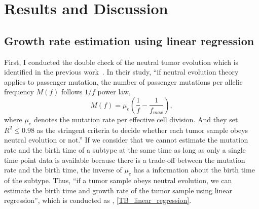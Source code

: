 \documentclass{article}
\begin{document}
\section{Results and Discussion}
\subsection{Growth rate estimation using linear regression}

First, I conducted the double check of the neutral tumor evolution which is identified in the previous work~\cite{williams2016identification}.
In their study, ``if neutral evolution theory applies to passenger mutation, the number of passenger mutations per allelic frequency $M(f)$ follows $1/f$ power law,
\begin{equation}
 M(f) = \mu_e \left( \frac{1}{f} - \frac{1}{f_{max}}\right),\label{neutral_evolution}
\end{equation}
where $\mu_e$ denotes the mutation rate per effective cell division.
And they set $R^2 \leq 0.98$ as the stringent criteria to decide whether each tumor sample obeys neutral evolution or not.''
If we consider that we cannot estimate the mutation rate and the birth time of a subtype at the same time as long as only a single time point data is available
because there is a trade-off between the mutation rate and the birth time, the inverse of $\mu_e$ has a information about the birth time of the subtype.
Thus, ``if a tumor sample obeys neutral evolution, we can estimate the birth time and growth rate of the tumor sample using linear regression'', which is conducted as , \ref{TB_linear_regression}.
\end{document}
